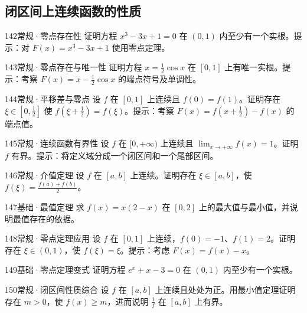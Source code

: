 \subsection{闭区间上连续函数的性质}
\begin{exercise}{142}{常规·零点存在性}
证明方程 $x^3-3x+1=0$ 在 $(0,1)$ 内至少有一个实根。提示：对 $F(x)=x^3-3x+1$ 使用零点定理。
\end{exercise}
\begin{exercise}{143}{常规·零点存在与唯一性}
证明方程 $x=\frac12\cos x$ 在 $[0,1]$ 上有唯一实根。提示：考察 $F(x)=x-\frac12\cos x$ 的端点符号及单调性。
\end{exercise}
\begin{exercise}{144}{常规·平移差与零点}
设 $f$ 在 $[0,1]$ 上连续且 $f(0)=f(1)$。证明存在 $\xi\in[0,\frac{1}{2}]$ 使 $f(\xi+\frac{1}{2})=f(\xi)$。提示：考察 $F(x)=f(x+\frac{1}{2})-f(x)$ 的端点值。
\end{exercise}
\begin{exercise}{145}{常规·连续函数有界性}
设 $f$ 在 $[0,+\infty)$ 上连续且 $\lim_{x\to+\infty}f(x)=1$。证明 $f$ 有界。提示：将定义域分成一个闭区间和一个尾部区间。
\end{exercise}
\begin{exercise}{146}{常规·介值定理}
设 $f$ 在 $[a,b]$ 上连续。证明存在 $\xi\in[a,b]$，使 $f(\xi)=\frac{f(a)+f(b)}{2}$。
\end{exercise}
\begin{exercise}{147}{基础·最值定理}
求 $f(x)=x(2-x)$ 在 $[0,2]$ 上的最大值与最小值，并说明最值存在的依据。
\end{exercise}
\begin{exercise}{148}{常规·零点定理应用}
设 $f$ 在 $[0,1]$ 上连续，$f(0)=-1$、$f(1)=2$。证明存在 $\xi\in(0,1)$，使 $f(\xi)=\xi$。提示：考虑 $F(x)=f(x)-x$。
\end{exercise}
\begin{exercise}{149}{基础·零点定理变式}
证明方程 $e^x+x-3=0$ 在 $(0,1)$ 内至少有一个实根。
\end{exercise}
\begin{exercise}{150}{常规·闭区间性质综合}
设 $f$ 在 $[a,b]$ 上连续且处处为正。用最小值定理证明存在 $m>0$，使 $f(x)\ge m$，进而说明 $\frac{1}{f}$ 在 $[a,b]$ 上有界。
\end{exercise}
